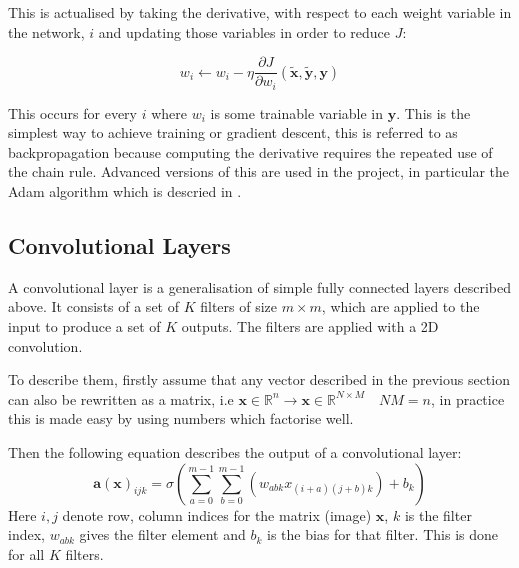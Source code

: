       This is actualised by taking the derivative, with respect to each weight variable
      in the network, $i$ and updating those variables in order to reduce $J$:

      \begin{equation}
        w_i \leftarrow w_i - \eta \frac{\partial J }{\partial w_{i}}(\tilde{\mathbf{x}},\tilde{\mathbf{y}},\mathbf{y})
      \end{equation}

      This occurs for every $i$ where $w_i$ is some trainable variable in $\mathbf{y}$.
      This is the simplest way to achieve training or gradient descent, this is referred to as backpropagation
      because computing the derivative requires the repeated use of the chain rule.
      Advanced versions of this are used in the project, in particular the Adam algorithm
      which is descried in \cite{adam}.

  \subsection{Convolutional Layers}
    A convolutional layer is a generalisation of simple fully connected layers described
    above. It consists of a set of $K$ filters of size $m\times m$, which are applied to the input to produce
    a set of $K$ outputs. The filters are applied with a 2D convolution.


    To describe them, firstly assume that any vector described in the previous section
    can also be rewritten as a matrix, i.e $\mathbf{x} \in \mathbb{R}^{n}
    \rightarrow \mathbf{x} \in \mathbb{R}^{N \times M} \quad NM=n$, in practice this is made
    easy by using numbers which factorise well.

    Then the following equation describes the output of a convolutional layer:
    \begin{equation} \label{CNN}
      \mathbf{a}(\mathbf{x})_{ijk} = \sigma \left ( \sum_{a=0}^{m-1}\sum_{b=0}^{m-1}(w_{abk}x_{(i+a)(j+b)k}) + b_k \right )
    \end{equation}
    Here $i,j$  denote row, column indices for the matrix (image) $\mathbf{x}$, $k$ is the filter index, $w_{abk}$
    gives the filter element and $b_k$ is the bias for that filter. This is done for all $K$ filters.

